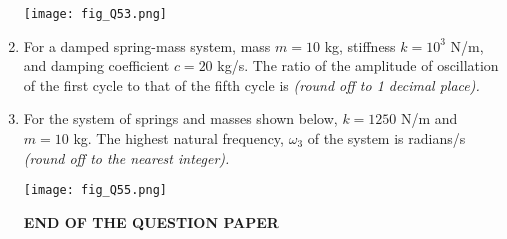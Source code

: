 \documentclass[12pt]{article}
\begin{document}
\begin{enumerate}[label=Q.\arabic*, start=26]
		\begin{center}
			\texttt{[image: fig\_Q53.png]}
		\end{center}

	\item For a damped spring-mass system, mass $m = 10$ kg, stiffness $k = 10^3$ N/m, and damping coefficient $c = 20$ kg/s. The ratio of the amplitude of oscillation of the first cycle to that of the fifth cycle is \underline{\hspace{2cm}} \textit{(round off to 1 decimal place).}
	\item For the system of springs and masses shown below, $k = 1250$ N/m and $m = 10$ kg. The highest natural frequency, $\omega_3$ of the system is \underline{\hspace{2cm}} radians/s \textit{(round off to the nearest integer).}

		\begin{center}
			\texttt{[image: fig\_Q55.png]}
		\end{center}
		\begin{center}
			{\textbf{END OF THE QUESTION PAPER}}
		\end{center}
\end{enumerate}
\newpage
\pagestyle{empty}
\renewcommand{\arraystretch}{1.5}
\end{document}
